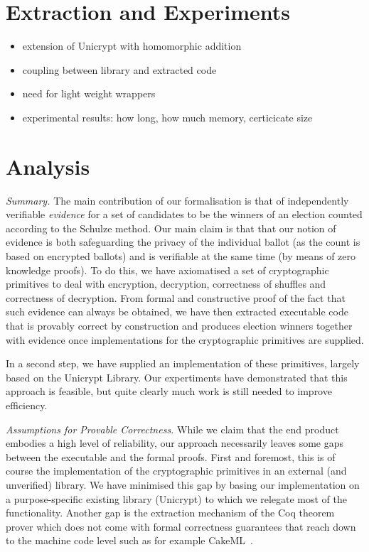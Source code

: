 \documentclass{llncs}
\begin{document}
\section{Extraction and Experiments}
\begin{itemize}
  \item extension of Unicrypt with homomorphic addition
  \item coupling between library and extracted code
  \item need for light weight wrappers
  \item experimental results: how long, how much memory, certicicate
  size
\end{itemize}

\section{Analysis}

\noindent\emph{Summary.} The main contribution of our formalisation is that of independently
verifiable \emph{evidence} for a set of candidates to be the winners
of an election counted according to the Schulze method. Our main
claim is that that our notion of evidence is both safeguarding the
privacy of the individual ballot (as the count is based on encrypted
ballots) and is verifiable at the same time (by means of zero
knowledge proofs). To do this, we have axiomatised a set of
cryptographic primitives to deal with encryption, decryption,
correctness of shuffles and correctness of decryption. From formal
and constructive proof of the fact that such evidence can always be
obtained, we have then extracted executable code that is provably
correct by construction and produces election winners together with
evidence once implementations for the cryptographic primitives are
supplied.

In a second step, we have supplied an implementation of these
primitives, largely based on the Unicrypt Library. Our expertiments
have demonstrated that this approach is feasible, but quite clearly
much work is still needed to improve efficiency. 

\smallskip\noindent\emph{Assumptions for Provable Correctness.}
While we claim that the end product embodies a high level of
reliability, our approach necessarily leaves some gaps between the
executable and the formal proofs. First and foremost, this is of
course the implementation of the cryptographic primitives in an
external (and unverified) library. We have minimised this gap by
basing our implementation on a purpose-specific existing library
(Unicrypt) to which we relegate most of the functionality. Another
gap is the extraction mechanism of the Coq theorem prover which does
not come with formal correctness guarantees that reach down to the
machine code level such as for example CakeML~\cite{Kumar:2014:CVI}.
\end{document}
